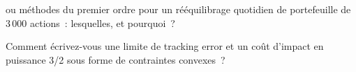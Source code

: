 \begin{interviewq}\label{iq:qm:convex-optimisation:5}
 ou méthodes du premier ordre pour un rééquilibrage quotidien de portefeuille de 3\,000 actions~: lesquelles, et pourquoi~?
\end{interviewq}

\begin{interviewq}\label{iq:qm:convex-optimisation:6}
Comment écrivez-vous une limite de tracking error et un coût d'impact en puissance 3/2 sous forme de contraintes convexes~?
\end{interviewq}
